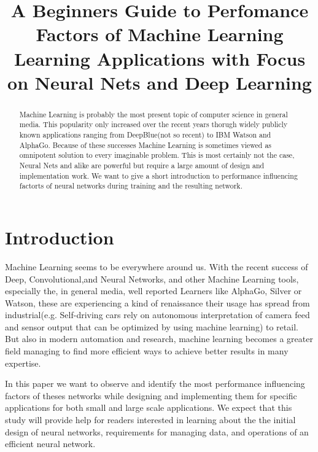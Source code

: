 \documentclass[conference]{IEEEtran}
\begin{document}
\title{
A Beginners Guide to Perfomance Factors of Machine Learning Learning Applications with Focus on Neural Nets and Deep Learning
}

\author{
}

\maketitle

\begin{abstract}

Machine Learning is probably the most present topic of computer science in general media. This popularity only increased over the recent years thorugh widely publicly known applications ranging from DeepBlue(not so recent) to IBM Watson and AlphaGo. Because of these successes Machine Learning is sometimes viewed as omnipotent solution to every imaginable problem. This is most certainly not the case, Neural Nets and alike are powerful but require a large amount of design and implementation work. We want to give a short introduction to performance influencing factorts of neural networks during training and the resulting network.

\end{abstract}

\IEEEpeerreviewmaketitle
\section{Introduction}
Machine Learning seems to be everywhere around us. With the recent success of Deep, Convolutional,and Neural Networks, and other Machine Learning tools, especially the, in general media, well reported Learners like AlphaGo, Silver or Watson, these are experiencing a kind of renaissance their usage has spread from industrial(e.g. Self-driving cars rely on autonomous interpretation of camera feed and sensor output that can be optimized by using machine learning) to retail. But also in modern automation and research, machine learning becomes a greater field managing to find more efficient ways to achieve better results in many expertise.

In this paper we want to observe and identify the most performance influencing factors of theses networks while designing and implementing them for specific applications for both small and large scale applications.
We expect that this study will provide help for readers interested in learning about the the initial design of neural networks, requirements for managing data, and operations of an efficient neural network.
\end{document}
